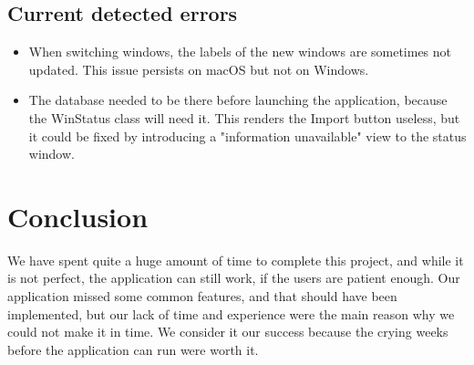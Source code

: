 \documentclass[12pt,oneside,a4paper]{article}
\begin{document}
\subsection{Current detected errors}
\begin{itemize}
  \item When switching windows, the labels of the new windows are sometimes not updated. This issue persists on macOS but not on Windows.
  \item The database needed to be there before launching the application, because the WinStatus class will need it. This renders the Import button useless, but it could be fixed by introducing a "information unavailable" view to the status window.
\end{itemize}

\section{Conclusion}
We have spent quite a huge amount of time to complete this project, and while it is not perfect, the application can still work, if the users are patient enough. Our application missed some common features, and that should have been implemented, but our lack of time and experience were the main reason why we could not make it in time. We consider it our success because the crying weeks before the application can run were worth it.
\end{document}
